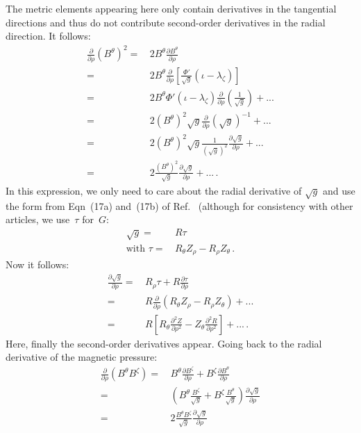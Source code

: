 %
The metric elements appearing here
only contain derivatives in the tangential directions
and thus do not contribute second-order derivatives in the radial direction.
%
It follows:
\begin{align}
 \frac{\partial}{\partial \rho} (B^\theta)^2
 =&\, 2 B^\theta \frac{\partial B^\theta}{\partial \rho} \nonumber \\
 =&\, 2 B^\theta \frac{\partial}{\partial \rho} \left[
        \frac{\Phi'}{\sqrt{g}} \left( \iota - \lambda_\zeta  \right) \right] \nonumber \\
 =&\, 2 B^\theta \Phi' \left( \iota - \lambda_\zeta  \right)
      \frac{\partial}{\partial \rho} \left( \frac{1}{\sqrt{g}} \right) + ... \nonumber \\
 =&\, 2 (B^\theta)^2 \sqrt{g}
      \frac{\partial}{\partial \rho} \left( \sqrt{g} \right)^{-1} + ... \nonumber \\
 =&\, 2 (B^\theta)^2 \sqrt{g} \frac{1}{(\sqrt{g})^2}
      \frac{\partial \sqrt{g}}{\partial \rho} + ... \nonumber \\
 =&\, 2 \frac{(B^\theta)^2}{\sqrt{g}}
      \frac{\partial \sqrt{g}}{\partial \rho} + ... \, .
\end{align}
%
In this expression, we only need to care about
the radial derivative of $\sqrt{g}$
and use the form from Eqn~(17a) and~(17b) of Ref.~\cite{hirshman_whitson_1983}
(although for consistency with other articles, we use~$\tau$ for~$G$:
\begin{align}
 \sqrt{g} =&\, R \tau \nonumber \\
 \textrm{with } \tau =&\, R_\theta Z_\rho - R_\rho Z_\theta \, .
\end{align}
%
Now it follows:
\begin{align}
 \frac{\partial \sqrt{g}}{\partial \rho}
 =&\, R_\rho \tau + R \frac{\partial \tau}{\partial \rho} \nonumber \\
 =&\, R \frac{\partial}{\partial \rho}
      \left( R_\theta Z_\rho - R_\rho Z_\theta \right) + ... \nonumber \\
 =&\, R \left[   R_\theta \frac{\partial^2 Z}{\partial \rho^2}
               - Z_\theta \frac{\partial^2 R}{\partial \rho^2} \right] + ... \, .
\end{align}
%
Here, finally the second-order derivatives appear.
%
Going back to the radial derivative of the magnetic pressure:
\begin{align}
 \frac{\partial}{\partial \rho} (B^\theta B^\zeta)
 =&\, B^\theta \frac{\partial B^\zeta }{\partial \rho}
     + B^\zeta \frac{\partial B^\theta}{\partial \rho} \nonumber \\
 =&\, \left(  B^\theta \frac{B^\zeta }{\sqrt{g}}
            + B^\zeta  \frac{B^\theta}{\sqrt{g}} \right)
            \frac{\partial \sqrt{g}}{\partial \rho} \nonumber \\
 =&\, 2 \frac{B^\theta B^\zeta}{\sqrt{g}}
        \frac{\partial \sqrt{g}}{\partial \rho}
\end{align}
